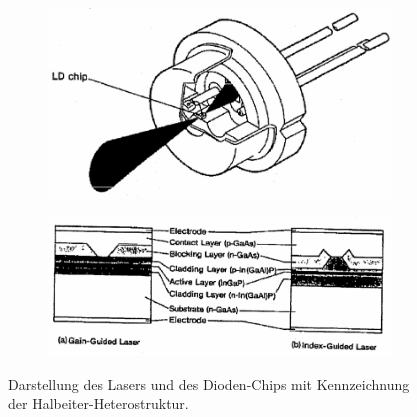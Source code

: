 \begin{figure}
  \begin{subfigure}[c]{0.5\textwidth}
    \centering
    \includegraphics[width=\textwidth]{images/Diodenl.pdf}
    \label{fig:chip}
  \end{subfigure}
  \begin{subfigure}[c]{0.5\textwidth}
    \includegraphics[width=\textwidth]{images/schema.pdf}
    \label{fig:struktur}
  \end{subfigure}
  \caption{Darstellung des Lasers und des Dioden-Chips mit Kennzeichnung der
  Halbeiter-Heterostruktur\cite{anleitung}.}
\end{figure}

